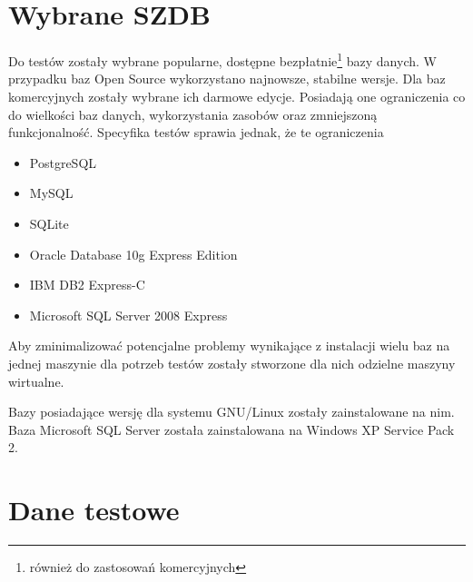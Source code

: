 \section{Wybrane SZDB}

Do testów zostały wybrane popularne, dostępne bezpłatnie\footnote{również do zastosowań komercyjnych} bazy danych. 
W przypadku baz Open Source wykorzystano najnowsze, stabilne wersje.
Dla baz komercyjnych zostały wybrane ich darmowe edycje. Posiadają one
ograniczenia co do wielkości baz danych, wykorzystania zasobów oraz zmniejszoną funkcjonalność. 
Specyfika testów sprawia jednak, że te ograniczenia 


\begin{itemize}
 \item PostgreSQL
 \item MySQL
 \item SQLite
 \item Oracle Database 10g Express Edition
 \item IBM DB2 Express-C
 \item Microsoft SQL Server 2008 Express
\end{itemize}

Aby zminimalizować potencjalne problemy wynikające z instalacji wielu baz na jednej maszynie dla potrzeb testów zostały stworzone dla nich odzielne maszyny wirtualne. 

Bazy posiadające wersję dla systemu GNU/Linux zostały zainstalowane na nim. Baza Microsoft SQL Server została zainstalowana na Windows XP Service Pack 2.





% 

\section{Dane testowe}




